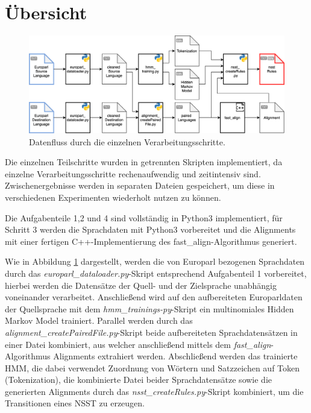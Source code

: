 \documentclass[conference]{IEEEtran}
\begin{document}
\section{Übersicht}
\begin{figure}
  \center
  \includegraphics[width=1\textwidth]{img/overview.png}
  \caption{Datenfluss durch die einzelnen Verarbeitungsschritte.}
  \label{Fig:Overview}
\end{figure}

Die einzelnen Teilschritte wurden in getrennten Skripten implementiert, da einzelne Verarbeitungsschritte rechenaufwendig und zeitintensiv sind.
Zwischenergebnisse werden in separaten Dateien gespeichert, um diese in verschiedenen Experimenten wiederholt nutzen zu können.

Die Aufgabenteile 1,2 und 4 sind vollständig in Python3 implementiert, für Schritt 3 werden die Sprachdaten mit Python3\- vorbereitet und die Alignments mit einer fertigen C++-Implementierung des fast\_align-Algorithmus \cite{fast_align} generiert.

Wie in Abbildung \ref{Fig:Overview} dargestellt, werden die von Europarl bezogenen Sprachdaten durch das \textit{europarl\_dataloader.py}-Skript entsprechend Aufgabenteil 1 vorbereitet, hierbei werden die Datensätze der Quell- und der Zielsprache unabhängig voneinander verarbeitet.
Anschließend wird auf den aufbereiteten Europarldaten der Quellsprache mit dem \textit{hmm\_trainings-py}-Skript ein multinomiales Hidden Markov Model trainiert.
Parallel werden durch das \textit{alignment\_createPairedFile.py}-Skript beide aufbereiteten Sprachdatensätzen in einer Datei kombiniert, aus welcher anschließend mittels dem \textit{fast\_align}-Algorithmus Alignments extrahiert werden.
Abschließend werden das trainierte HMM, die dabei verwendet Zuordnung von Wörtern und Satzzeichen auf Token (Tokenization), die kombinierte Datei beider Sprachdatensätze sowie die generierten Alignments durch das \textit{nsst\_createRules.py}-Skript kombiniert, um die Transitionen eines NSST zu erzeugen.
\end{document}
